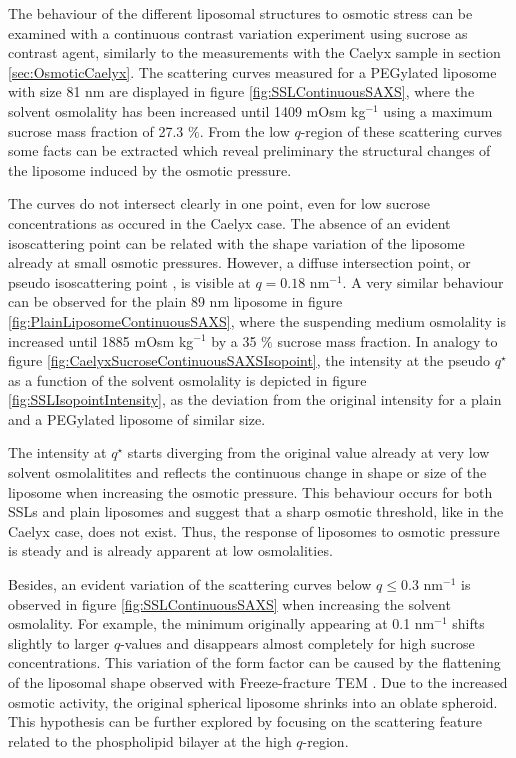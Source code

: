 The behaviour of the different liposomal structures to osmotic stress can be examined with a continuous contrast variation experiment using sucrose as contrast agent, similarly to the measurements with the Caelyx sample in section \ref{sec:OsmoticCaelyx}. The scattering curves measured for a PEGylated liposome with size 81 nm are displayed in figure \ref{fig:SSLContinuousSAXS}, where the solvent osmolality has been increased until 1409 mOsm kg$^{-1}$ using a maximum sucrose mass fraction of 27.3 $\%$. From the low $q$-region of these scattering curves some facts can be extracted which reveal preliminary the structural changes of the liposome induced by the osmotic pressure.

The curves do not intersect clearly in one point, even for low sucrose concentrations as occured in the Caelyx case. The absence of an evident isoscattering point can be related with the shape variation of the liposome already at small osmotic pressures. However, a diffuse intersection point, or pseudo isoscattering point \citep{kawaguchi_application_2004}, is visible at $q=0.18$ nm$^{-1}$. A very similar behaviour can be observed for the plain 89 nm liposome in figure \ref{fig:PlainLiposomeContinuousSAXS}, where the suspending medium osmolality is increased until 1885 mOsm kg$^{-1}$ by a 35 $\%$ sucrose mass fraction. In analogy to figure \ref{fig:CaelyxSucroseContinuousSAXSIsopoint}, the intensity at the pseudo $q^{\star}$ as a function of the solvent osmolality is depicted in figure \ref{fig:SSLIsopointIntensity}, as the deviation from the original intensity for a plain and a PEGylated liposome of similar size.

The intensity at $q^{\star}$ starts diverging from the original value already at very low solvent osmolalitites and reflects the continuous change in shape or size of the liposome when increasing the osmotic pressure. This behaviour occurs for both SSLs and plain liposomes and suggest that a sharp osmotic threshold, like in the Caelyx case, does not exist. Thus, the response of liposomes to osmotic pressure is steady and is already apparent at low osmolalities.

Besides, an evident variation of the scattering curves below $q\leq0.3$ nm$^{-1}$ is observed in figure \ref{fig:SSLContinuousSAXS} when increasing the solvent osmolality. For example, the minimum originally appearing at 0.1 nm$^{-1}$ shifts slightly to larger $q$-values and disappears almost completely for high sucrose concentrations. This variation of the form factor can be caused by the flattening of the liposomal shape observed with Freeze-fracture TEM \citep{varga_osmotic_2014}. Due to the increased osmotic activity, the original spherical liposome shrinks into an oblate spheroid. This hypothesis can be further explored by focusing on the scattering feature related to the phospholipid bilayer at the high $q$-region.

